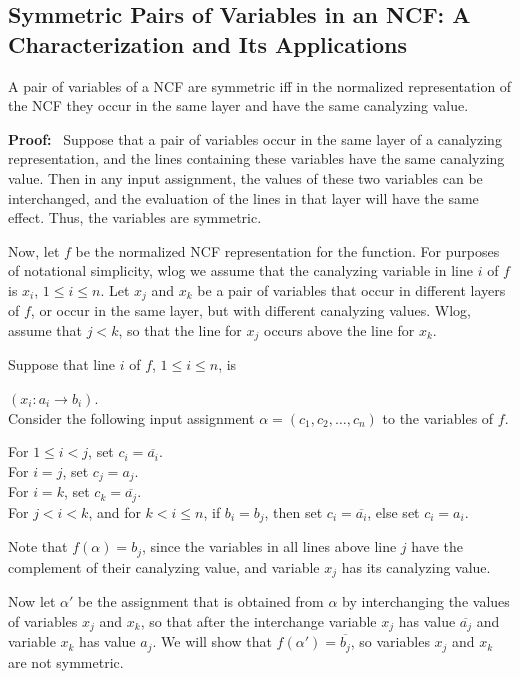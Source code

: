 \subsection{Symmetric Pairs of Variables in an NCF: A Characterization
and Its Applications}
\label{sse:ncf_strong_sym}

\begin{theorem}\label{thm:ncf_symmetric_variables}
A pair of variables of a NCF are symmetric iff
in the normalized representation of the NCF
they occur in the same layer and have the same canalyzing value.
\end{theorem}
\noindent
\textbf{Proof:}~
Suppose that a pair of variables occur in the same layer of a
canalyzing representation, and the lines containing these variables
have the same canalyzing value.  Then in any input assignment, the
values of these two variables can be interchanged, and the evaluation
of the lines in that layer will have the same effect.  Thus, the
variables are symmetric.

Now, let $f$ be the normalized NCF representation for the function.
For purposes of notational simplicity, wlog we assume that the
canalyzing variable in line $i$ of $f$ is $x_i$, $1 \leq i \leq n$.
Let  $x_j$ and $x_k$ be a pair of variables that occur in different
layers of $f$, or occur in the same layer, but with different
canalyzing values.  Wlog, assume that $j < k$, so that the line for
$x_j$ occurs above the line for $x_k$.

Suppose that line $i$ of $f$, $1 \leq i \leq n$, is 

\noindent
$(x_i : a_i \rightarrow b_i)$. \\
Consider the following input assignment $\alpha = (c_1, c_2, \ldots,  c_n)$ 
to the variables of $f$.

\noindent
For $1 \leq i < j$, set $c_i = \overline{a_i}$. \\
For $i = j$, set $c_j =a_j$. \\
For $i = k$, set $c_k =\overline{a_j}$. \\
For $j < i < k$, and for  $k < i \leq n$, 
if $b_i = b_j$, then set $c_i =  \overline{a_i}$,
else set $c_i =  a_i$.

Note that $f(\alpha) = b_j$, since the variables in all lines above
line $j$ have the complement of their canalyzing value, and variable
$x_j$ has its canalyzing value.

Now let $\alpha'$ be the assignment that is obtained from $\alpha$
by interchanging the values of variables $x_j$ and $x_k$, so that
after the interchange variable $x_j$ has value $\overline{a_j}$ and
variable $x_k$ has value $a_j$.  We will show that $f(\alpha') =
\overline{b_j}$, so variables $x_j$ and $x_k$ are not symmetric.

